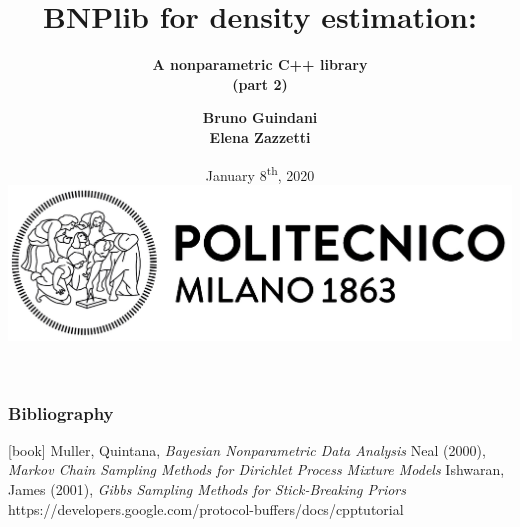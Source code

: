 \documentclass{beamer}
\title[BNPlib]{\textbf{BNPlib for density estimation:}}
\subtitle{\textbf{A nonparametric C++ library \\ (part 2)}}
\author[Guindani, Zazzetti]{\textbf{Bruno Guindani \\ Elena Zazzetti}}
\institute[PoliMi]{}
\date[2020/01/08]{
	January 8\textsuperscript{th}, 2020 \\[15pt]
	\includegraphics[scale=.35]{../etc/logo_long.jpg}
}
\begin{document}





\begin{frame}
	\frametitle{Bibliography}
	\begin{thebibliography}{9}
		 Muller, Quintana, \textit{Bayesian Nonparametric Data Analysis}
		 Neal (2000), \textit{Markov Chain Sampling Methods for Dirichlet Process Mixture Models}
		 Ishwaran, James (2001), \textit{Gibbs Sampling Methods for Stick-Breaking Priors}
		 https://developers.google.com/protocol-buffers/docs/cpptutorial
	\end{thebibliography}
\end{frame}
\end{document}
